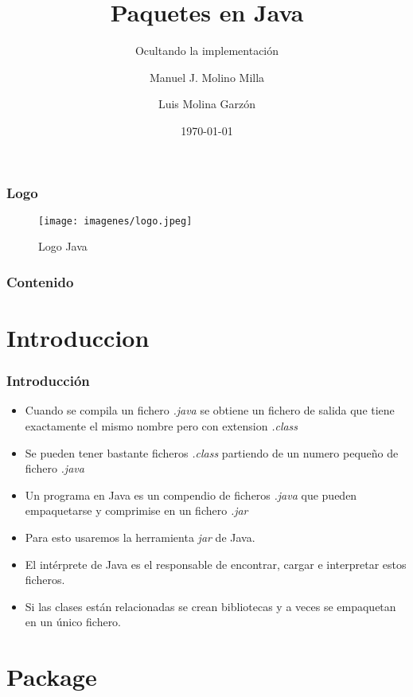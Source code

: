 \documentclass{beamer}
\title{Paquetes en Java}
\subtitle{Ocultando la implementación}
\author{Manuel J. Molino Milla \and Luis Molina Garzón}
\date{\today} %
\institute{IES Virgen del Carmen \and Departamento de Informática}
\begin{document}
\begin{frame}
  \titlepage
\end{frame}

\begin{frame}
    \frametitle{Logo}
\begin{figure}
\texttt{[image: imagenes/logo.jpeg]} 
\caption{Logo Java}
\end{figure}
\end{frame}

\begin{frame}
  \frametitle{Contenido}
  \tableofcontents[pausesections]
\end{frame}



\section{Introduccion}


\begin{frame}
    \frametitle{Introducción}

\begin{itemize}[<+-| alert@+>]
      \item Cuando se compila un fichero \emph{.java} se obtiene un fichero de salida que tiene exactamente el mismo nombre pero con extension \emph{.class}  
      \item Se pueden tener bastante ficheros \emph{.class} partiendo de un numero pequeño de fichero \emph{.java}
      \item Un programa en Java es un compendio de ficheros \emph{.java} que pueden empaquetarse y comprimise en un fichero \emph{.jar}      
      \item Para esto usaremos la herramienta \emph{jar} de Java.
      \item El intérprete de Java es el responsable de encontrar, cargar e interpretar estos ficheros.
      \item Si las clases están relacionadas se crean bibliotecas y a veces se empaquetan en un único fichero.
    \end{itemize}
    \pause
\end{frame}



\section{Package}
\end{document}

